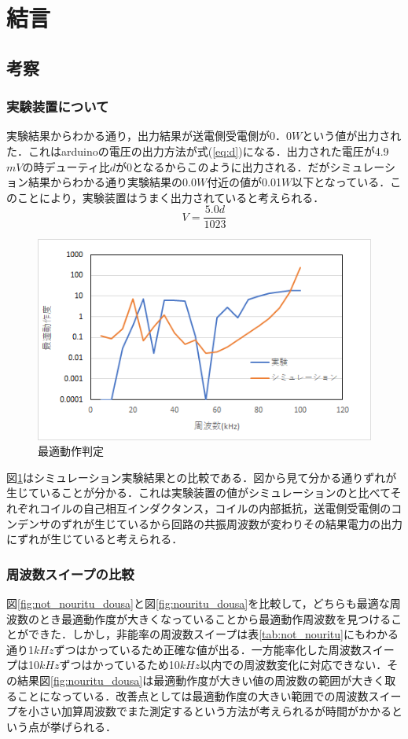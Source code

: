 \documentclass[12pt]{jarticle}
\begin{document}
\section{結言}
\subsection{考察}
\subsubsection{実験装置について}
実験結果からわかる通り，出力結果が送電側受電側が0．0$W$という値が出力された．これはarduinoの電圧の出力方法が式(\ref{eq:d})になる．出力された電圧が4.9$mV$の時デューティ比$d$が0となるからこのように出力される．だがシミュレーション結果からわかる通り実験結果の0.0$W$付近の値が0.01$W$以下となっている．このことにより，実験装置はうまく出力されていると考えられる．
\begin{equation}
\label{eq:d}
V=\frac{5.0d}{1023}
\end{equation}
\begin{figure}[H]
	\centering
	\includegraphics[]{simuhikaku.png}
	\caption{最適動作判定}
	\label{fig:simuhikaku}
\end{figure}
図\ref{fig:simuhikaku}はシミュレーション実験結果との比較である．図から見て分かる通りずれが生じていることが分かる．これは実験装置の値がシミュレーションのと比べてそれぞれコイルの自己相互インダクタンス，コイルの内部抵抗，送電側受電側のコンデンサのずれが生じているから回路の共振周波数が変わりその結果電力の出力にずれが生じていると考えられる．
\subsubsection{周波数スイープの比較}
図\ref{fig:not_nouritu_dousa}と図\ref{fig:nouritu_dousa}を比較して，どちらも最適な周波数のとき最適動作度が大きくなっていることから最適動作周波数を見つけることができた．しかし，非能率の周波数スイープは表\ref{tab:not_nouritu}にもわかる通り1$kHz$ずつはかっているため正確な値が出る．一方能率化した周波数スイープは10$kHz$ずつはかっているため10$kHz$以内での周波数変化に対応できない．その結果図\ref{fig:nouritu_dousa}は最適動作度が大きい値の周波数の範囲が大きく取ることになっている．改善点としては最適動作度の大きい範囲での周波数スイープを小さい加算周波数でまた測定するという方法が考えられるが時間がかかるという点が挙げられる．
\end{document}
